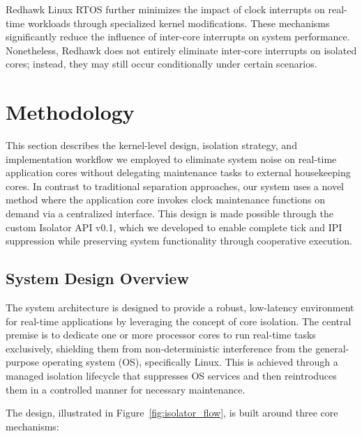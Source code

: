 \documentclass[letterpaper]{article}
\begin{document}
Redhawk Linux RTOS \cite{redhawk} further minimizes the impact of clock interrupts on real-time workloads 
through specialized kernel modifications. These mechanisms significantly reduce the influence 
of inter-core interrupts on system performance. Nonetheless, Redhawk does not entirely eliminate 
inter-core interrupts on isolated cores; instead, they may still occur conditionally under certain scenarios.


\section{Methodology}\label{BE}

This section describes the kernel-level design, isolation strategy, and implementation workflow we employed
to eliminate system noise on real-time application cores without delegating maintenance tasks to external
housekeeping cores. In contrast to traditional separation approaches, our system uses a novel method
where the application core invokes clock maintenance functions on demand via a centralized interface.
This design is made possible through the custom Isolator API v0.1, which we developed to enable complete
tick and IPI suppression while preserving system functionality through cooperative execution.

\subsection{System Design Overview}
\label{subsec:system-design}

The system architecture is designed to provide a robust, low-latency environment for real-time applications by leveraging the concept of core isolation. The central premise is to dedicate one or more processor cores to run real-time tasks exclusively, shielding them from non-deterministic interference from the general-purpose operating system (OS), specifically Linux. This is achieved through a managed isolation lifecycle that suppresses OS services and then reintroduces them in a controlled manner for necessary maintenance.

The design, illustrated in Figure~\ref{fig:isolator_flow}, is built around three core mechanisms:
\end{document}
